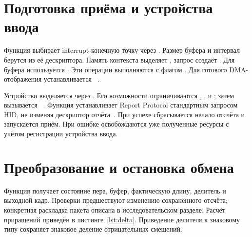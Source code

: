 \par\noindent\begin{minipage}{\linewidth}

\end{minipage}\par

\section{Подготовка приёма и устройства ввода}

Функция  выбирает interrupt-конечную точку через . Размер буфера и интервал берутся из её дескриптора. Память контекста выделяет , запрос создаёт . Для буфера используется . Эти операции выполняются с флагом . Для готового DMA-отображения устанавливается ~\cite{kernelusb}.

Устройство выделяется через . Его возможности ограничиваются , ,  и ; затем вызывается ~\cite{kernelinput}. Функция  устанавливает Report Protocol стандартным запросом HID, не изменяя дескриптор отчёта~\cite{usb_hid}. При успехе сбрасывается начало отсчёта и запускается приём. При ошибке освобождаются уже полученные ресурсы с учётом регистрации устройства ввода.

\section{Преобразование и остановка обмена}

Функция  получает состояние пера, буфер, фактическую длину, делитель и выходной кадр. Проверки предшествуют изменению сохранённого отсчёта; конкретная раскладка пакета описана в исследовательском разделе. Расчёт приращений приведён в листинге~\ref{lst:delta}. Приведение делителя к знаковому типу сохраняет знаковое деление отрицательных смещений.

\par\noindent\begin{minipage}{\linewidth}

\end{minipage}\par

